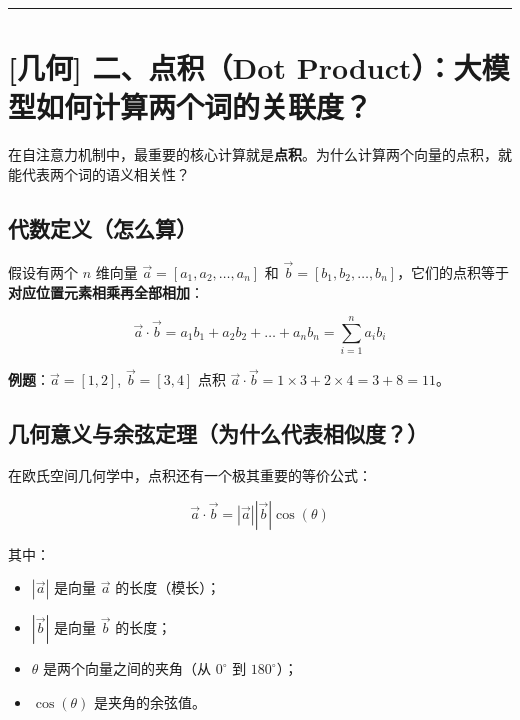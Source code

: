 \vspace{0.8em}\hrule\vspace{0.8em}

\section{[几何] 二、点积（Dot Product）：大模型如何计算两个词的关联度？}

在自注意力机制中，最重要的核心计算就是\textbf{点积}。为什么计算两个向量的点积，就能代表两个词的语义相关性？

\subsection{代数定义（怎么算）}

假设有两个 $n$ 维向量 $\vec{a} = [a_1, a_2, \dots, a_n]$ 和 $\vec{b} = [b_1, b_2, \dots, b_n]$，它们的点积等于\textbf{对应位置元素相乘再全部相加}：

\[
\vec{a} \cdot \vec{b} = a_1 b_1 + a_2 b_2 + \dots + a_n b_n = \sum_{i=1}^n a_i b_i
\]

\begin{noteBox}[核心导读与背景]
\textbf{例题}：$\vec{a} = [1, 2]$, $\vec{b} = [3, 4]$
点积 $\vec{a} \cdot \vec{b} = 1 \times 3 + 2 \times 4 = 3 + 8 = 11$。
\end{noteBox}

\subsection{几何意义与余弦定理（为什么代表相似度？）}

在欧氏空间几何学中，点积还有一个极其重要的等价公式：

\[
\vec{a} \cdot \vec{b} = |\vec{a}| |\vec{b}| \cos(\theta)
\]

其中：
\begin{itemize}
  \item $|\vec{a}|$ 是向量 $\vec{a}$ 的长度（模长）；
  \item $|\vec{b}|$ 是向量 $\vec{b}$ 的长度；
  \item $\theta$ 是两个向量之间的夹角（从 $0^\circ$ 到 $180^\circ$）；
  \item $\cos(\theta)$ 是夹角的余弦值。
\end{itemize}

